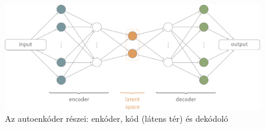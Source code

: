 
  


\begin{figure}[ht]
	\centering
	\includegraphics[width=1\columnwidth]{figures/ae.png}
	\caption{Az autoenkóder részei: enkóder, kód (látens tér) és dekódoló}
	\label{fig:autoenc_struct}
\end{figure}

